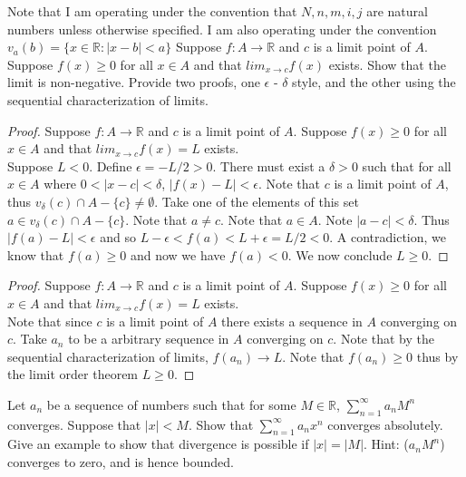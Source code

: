 \documentclass[12pt]{article}
\makeatletter
\theoremstyle{homework}
\newenvironment{exercise}[1]
{\def\@currentlabel{#1}\exercisecore}
{\endexercisecore}
\makeatother
\begin{document}
Note that I am operating under the convention that $N,n,m,i,j$ are natural numbers unless otherwise specified.  I am also operating under the convention $v_a(b)=\{x\in\mathbb{R}:|x-b|<a\}$
\begin{exercise}
1
Suppose $f : A \rightarrow \mathbb{R}$ and $c$ is a limit point of $A$. Suppose $f (x) \geq 0$ for all $x \in A$ and that
$lim_{x \rightarrow c}f (x)$ exists. Show that the limit is non-negative. Provide two proofs, one $\epsilon$ - $\delta$
style, and the other using the sequential characterization of limits.
\end{exercise}
\begin{proof}
Suppose $f : A \rightarrow \mathbb{R}$ and $c$ is a limit point of $A$. Suppose $f (x) \geq 0$ for all $x \in A$ and that
$lim_{x \rightarrow c}f (x)=L$ exists.\\
Suppose $L<0$.  Define $\epsilon=-L/2>0$.  There must exist a $\delta>0$ such that for all $x\in A$ where $0<|x-c|<\delta$, $|f(x)-L|<\epsilon$.  Note that $c$ is a limit point of $A$, thus $v_\delta(c)\cap A-\{c\}\neq \emptyset$.  Take one of the elements of this set $a\in v_\delta(c)\cap A-\{c\}$.  Note that $a\neq c$.  Note that $a\in A$.  Note $|a-c|<\delta$.  Thus $|f(a)-L|<\epsilon$ and so $L-\epsilon<f(a)<L+\epsilon=L/2<0$.  A contradiction, we know that $f(a)\geq 0$ and now we have $f(a)<0$.  We now conclude $L\geq 0$.
\end{proof}
\begin{proof}
Suppose $f : A \rightarrow \mathbb{R}$ and $c$ is a limit point of $A$. Suppose $f (x) \geq 0$ for all $x \in A$ and that
$lim_{x \rightarrow c}f (x)=L$ exists.\\
Note that since $c$ is a limit point of $A$ there exists a sequence in $A$ converging on $c$.  Take $a_n$ to be a arbitrary sequence in $A$ converging on $c$.  Note that by the sequential characterization of limits, $f(a_n)\rightarrow L$.  Note that $f(a_n)\geq 0$ thus by the limit order theorem $L\geq 0$.
\end{proof}
\begin{exercise} 2
Let $a_n$ be a sequence of numbers such that for some $M \in \mathbb{R}$, $\sum^\infty_{n=1} a_nM^n$ converges. Suppose
that $|x| < M$. Show that $\sum^\infty_{n=1} a_nx^n$ converges absolutely. Give an example to show
that divergence is possible if $|x| = |M|$. Hint: ($a_nM^n$) converges to zero, and is hence
bounded.
\end{exercise}
\end{document}
